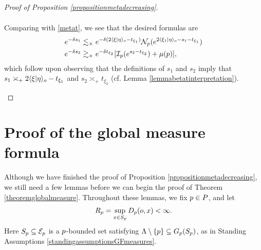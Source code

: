 \begin{proof}[Proof of Proposition \ref{propositionmetadecreasing}]
\begin{itemize}
\begin{align*}
\end{align*}
Comparing with \eqref{metat}, we see that the desired formulas are
\begin{align*}
e^{-\delta s_1} &\lesssim_\times e^{-\delta (2\langle \xi|\eta\rangle_o - t_{\xi_1})} \mathcal N_p(e^{2\langle \xi_1|\eta\rangle_o - s_1 - t_{\xi_1}})\\
e^{-\delta s_2} &\gtrsim_\times  e^{-\delta t_{\xi_2}}[\mathcal I_p(e^{s_2 - t_{\xi_2}}) + \mu(p)],
\end{align*}
which follow upon observing that the definitions of $s_1$ and $s_2$ imply that $s_1 \asymp_+ 2\langle \xi|\eta\rangle_o - t_{\xi_1}$ and $s_2 \asymp_\plus t_{\xi_2}$ (cf. Lemma \ref{lemmabetatinterpretation}).
\end{itemize}
\end{proof}

\section{Proof of the global measure formula}
\label{subsectionglobalmeasureproof}
Although we have finished the proof of Proposition \ref{propositionmetadecreasing}, we still need a few lemmas before we can begin the proof of Theorem \ref{theoremglobalmeasure}. Throughout these lemmas, we fix $p\in P$, and let
\[
R_p = \sup_{x\in S_p} D_p(o,x) < \infty.
\]
Here $S_p\subseteq\mathcal E_p$ is a $p$-bounded set satisfying $\Lambda\setminus\{p\}\subseteq G_p(S_p)$, as in Standing Assumptions \ref{standingassumptionsGFmeasures}.


